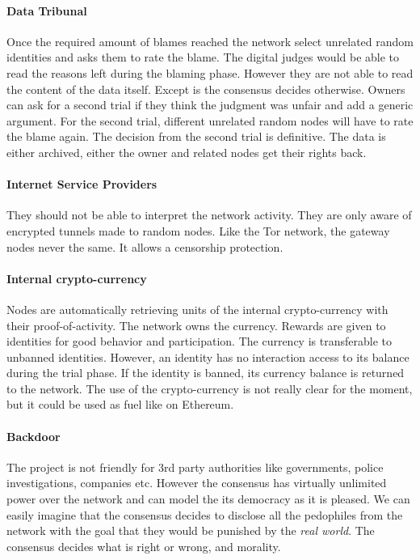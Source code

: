 \paragraph{Data Tribunal} Once the required amount of blames reached the network select unrelated random identities and asks them to rate the blame. The digital judges would be able to read the reasons left during the blaming phase. However they are not able to read the content of the data itself. Except is the consensus decides otherwise. Owners can ask for a second trial if they think the judgment was unfair and add a generic argument. For the second trial, different unrelated random nodes will have to rate the blame again. The decision from the second trial is definitive. The data is either archived, either the owner and related nodes get their rights back.

\paragraph{Internet Service Providers} They should not be able to interpret the network activity. They are only aware of encrypted tunnels made to random nodes. Like the Tor network, the gateway nodes never the same. It allows a censorship protection.

\paragraph{Internal crypto-currency} Nodes are automatically retrieving units of the internal crypto-currency with their proof-of-activity. The network owns the currency. Rewards are given to identities for good behavior and participation. The currency is transferable to unbanned identities. However, an identity has no interaction access to its balance during the trial phase. If the identity is banned, its currency balance is returned to the network. The use of the crypto-currency is not really clear for the moment, but it could be used as fuel like on Ethereum\cite{Ethereum2016EthereumDocumentation}.

\paragraph{Backdoor} The project is not friendly for 3rd party authorities like governments, police investigations, companies etc. However the consensus has virtually unlimited power over the network and can model the its democracy as it is pleased. We can easily imagine that the consensus decides to disclose all the pedophiles from the network with the goal that they would be punished by the \textit{real world}. The consensus decides what is right or wrong, and morality.

